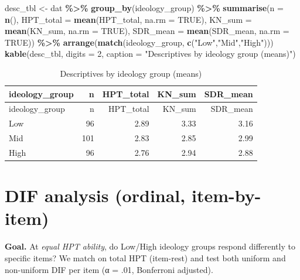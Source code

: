 \documentclass[
  10pt,
]{article}
\newenvironment{Shaded}{\begin{snugshade}}{\end{snugshade}}
\newcommand{\AttributeTok}[1]{\textcolor[rgb]{0.13,0.29,0.53}{#1}}
\newcommand{\ConstantTok}[1]{\textcolor[rgb]{0.56,0.35,0.01}{#1}}
\newcommand{\DecValTok}[1]{\textcolor[rgb]{0.00,0.00,0.81}{#1}}
\newcommand{\FunctionTok}[1]{\textcolor[rgb]{0.13,0.29,0.53}{\textbf{#1}}}
\newcommand{\NormalTok}[1]{#1}
\newcommand{\OtherTok}[1]{\textcolor[rgb]{0.56,0.35,0.01}{#1}}
\newcommand{\SpecialCharTok}[1]{\textcolor[rgb]{0.81,0.36,0.00}{\textbf{#1}}}
\newcommand{\StringTok}[1]{\textcolor[rgb]{0.31,0.60,0.02}{#1}}
\begin{document}
\begin{Shaded}
\begin{Highlighting}[]
\NormalTok{desc\_tbl }\OtherTok{\textless{}{-}}\NormalTok{ dat }\SpecialCharTok{\%\textgreater{}\%}
  \FunctionTok{group\_by}\NormalTok{(ideology\_group) }\SpecialCharTok{\%\textgreater{}\%}
  \FunctionTok{summarise}\NormalTok{(}\AttributeTok{n =} \FunctionTok{n}\NormalTok{(),}
            \AttributeTok{HPT\_total =} \FunctionTok{mean}\NormalTok{(HPT\_total, }\AttributeTok{na.rm =} \ConstantTok{TRUE}\NormalTok{),}
            \AttributeTok{KN\_sum    =} \FunctionTok{mean}\NormalTok{(KN\_sum,    }\AttributeTok{na.rm =} \ConstantTok{TRUE}\NormalTok{),}
            \AttributeTok{SDR\_mean  =} \FunctionTok{mean}\NormalTok{(SDR\_mean,  }\AttributeTok{na.rm =} \ConstantTok{TRUE}\NormalTok{)) }\SpecialCharTok{\%\textgreater{}\%}
  \FunctionTok{arrange}\NormalTok{(}\FunctionTok{match}\NormalTok{(ideology\_group, }\FunctionTok{c}\NormalTok{(}\StringTok{"Low"}\NormalTok{,}\StringTok{"Mid"}\NormalTok{,}\StringTok{"High"}\NormalTok{)))}
\FunctionTok{kable}\NormalTok{(desc\_tbl, }\AttributeTok{digits =} \DecValTok{2}\NormalTok{, }\AttributeTok{caption =} \StringTok{"Descriptives by ideology group (means)"}\NormalTok{)}
\end{Highlighting}
\end{Shaded}

\begin{longtable}[]{@{}lrrrr@{}}
\caption{Descriptives by ideology group (means)}\tabularnewline
\toprule\noalign{}
ideology\_group & n & HPT\_total & KN\_sum & SDR\_mean \\
\midrule\noalign{}
\endfirsthead
\toprule\noalign{}
ideology\_group & n & HPT\_total & KN\_sum & SDR\_mean \\
\midrule\noalign{}
\endhead
\bottomrule\noalign{}
\endlastfoot
Low & 96 & 2.89 & 3.33 & 3.16 \\
Mid & 101 & 2.83 & 2.85 & 2.99 \\
High & 96 & 2.76 & 2.94 & 2.88 \\
\end{longtable}

\hypertarget{dif-analysis-ordinal-item-by-item}{%
\section{DIF analysis (ordinal,
item-by-item)}\label{dif-analysis-ordinal-item-by-item}}

\textbf{Goal.} At \emph{equal HPT ability}, do Low/High ideology groups
respond differently to specific items? We match on total HPT (item-rest)
and test both uniform and non-uniform DIF per item (α = .01, Bonferroni
adjusted).
\end{document}
